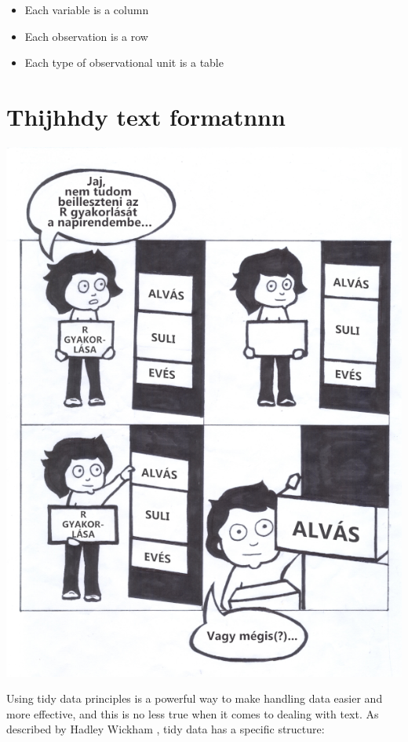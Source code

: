\documentclass[
]{book}
\providecommand{\tightlist}{%
  \setlength{\itemsep}{0pt}\setlength{\parskip}{0pt}}
\begin{document}
\begin{itemize}
\tightlist
\item
  Each variable is a column
\item
  Each observation is a row
\item
  Each type of observational unit is a table
\end{itemize}

\hypertarget{thijhhdy-text-formatnnn}{%
\chapter{Thijhhdy text formatnnn}\label{thijhhdy-text-formatnnn}}

\begin{center}\includegraphics[width=0.9\linewidth]{images/ch_05_small} \end{center}

Using tidy data principles is a powerful way to make handling data easier and more effective, and this is no less true when it comes to dealing with text. As described by Hadley Wickham \citep{tidydata}, tidy data has a specific structure:
\end{document}

